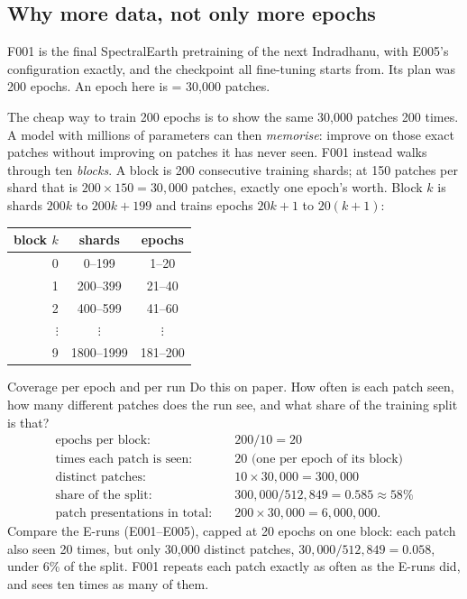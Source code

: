 \subsection{Why more data, not only more epochs}

F001 is the final SpectralEarth pretraining of the next Indradhanu, with E005's configuration exactly, and the
checkpoint all fine-tuning starts from. Its plan was 200 epochs. An epoch here is  =
30,000 patches.\tbrk{}

The cheap way to train 200 epochs is to show the same 30,000 patches 200 times. A model with millions of parameters can
then \emph{memorise}: improve on those exact patches without improving on patches it has never seen.
F001 instead walks through ten \emph{blocks}. A block is 200 consecutive training shards; at 150
patches per shard that is $200 \times 150 = 30{,}000$ patches, exactly one epoch's worth. Block $k$ is shards $200k$ to
$200k + 199$ and trains epochs $20k + 1$ to $20(k+1)$:
\begin{center}
\begin{tabular}{rcc}
\toprule
block $k$ & shards & epochs\\
\midrule
0 & 0--199 & 1--20\\
1 & 200--399 & 21--40\\
2 & 400--599 & 41--60\\
$\vdots$ & $\vdots$ & $\vdots$\\
9 & 1800--1999 & 181--200\\
\bottomrule
\end{tabular}
\end{center}

\begin{worked}[label={we:pretrain:coverage}]{Coverage per epoch and per run}
Do this on paper. How often is each patch seen, how many different patches does the run see, and what share of the
training split is that?
\begin{align*}
  \text{epochs per block:}&\quad 200 / 10 = 20\\
  \text{times each patch is seen:}&\quad 20 \text{ (one per epoch of its block)}\\
  \text{distinct patches:}&\quad 10 \times 30{,}000 = 300{,}000\\
  \text{share of the split:}&\quad 300{,}000 / 512{,}849 = 0.585 \approx 58\%\\
  \text{patch presentations in total:}&\quad 200 \times 30{,}000 = 6{,}000{,}000.
\end{align*}
Compare the E-runs (E001--E005), capped at 20 epochs on one block: each patch also seen 20 times, but only 30,000 distinct
patches, $30{,}000/512{,}849 = 0.058$, under 6\% of the split. F001 repeats each patch exactly as often as the E-runs did,
and sees ten times as many of them.
\end{worked}

